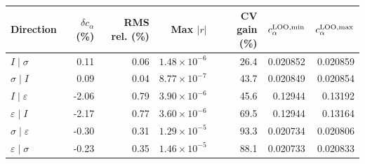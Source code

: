 \begin{tabular}{lrrrrrr}\toprule
Direction & $\delta c_\alpha$ (\%) & RMS rel. (\%) & Max $|r|$ & CV gain (\%) & $c_\alpha^{\rm LOO,min}$ & $c_\alpha^{\rm LOO,max}$\\\midrule
$I\mid \sigma$ & 0.11 & 0.06 & $1.48\!\times\!10^{-6}$ & 26.4 & 0.020852 & 0.020859 \\
$\sigma\mid I$ & 0.09 & 0.04 & $8.77\!\times\!10^{-7}$ & 43.7 & 0.020849 & 0.020854 \\
$I\mid \varepsilon$ & -2.06 & 0.79 & $3.90\!\times\!10^{-6}$ & 45.6 & 0.12944 & 0.13192 \\
$\varepsilon\mid I$ & -2.17 & 0.77 & $3.60\!\times\!10^{-6}$ & 69.5 & 0.12944 & 0.13164 \\
$\sigma\mid \varepsilon$ & -0.30 & 0.31 & $1.29\!\times\!10^{-5}$ & 93.3 & 0.020734 & 0.020806 \\
$\varepsilon\mid \sigma$ & -0.23 & 0.35 & $1.46\!\times\!10^{-5}$ & 88.1 & 0.020733 & 0.020833 \\
\bottomrule\end{tabular}
